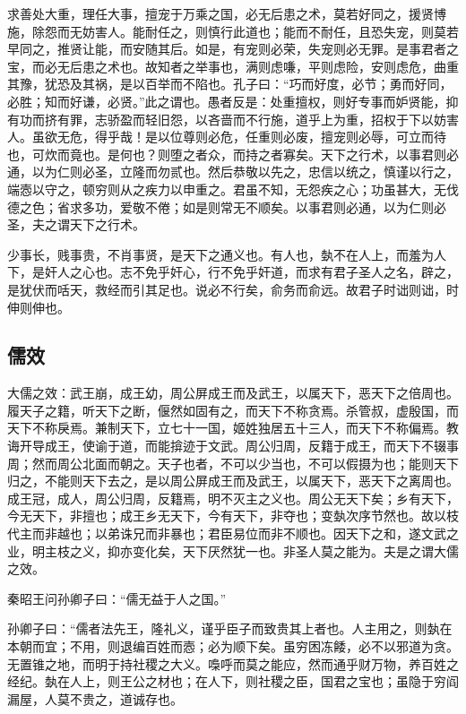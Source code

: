 \documentclass[]{article}
\begin{document}
求善处大重，理任大事，擅宠于万乘之国，必无后患之术，莫若好同之，援贤博施，除怨而无妨害人。能耐任之，则慎行此道也；能而不耐任，且恐失宠，则莫若早同之，推贤让能，而安随其后。如是，有宠则必荣，失宠则必无罪。是事君者之宝，而必无后患之术也。故知者之举事也，满则虑嗛，平则虑险，安则虑危，曲重其豫，犹恐及其祸，是以百举而不陷也。孔子曰：``巧而好度，必节；勇而好同，必胜；知而好谦，必贤。''此之谓也。愚者反是：处重擅权，则好专事而妒贤能，抑有功而挤有罪，志骄盈而轻旧怨，以吝啬而不行施，道乎上为重，招权于下以妨害人。虽欲无危，得乎哉！是以位尊则必危，任重则必废，擅宠则必辱，可立而待也，可炊而竟也。是何也？则堕之者众，而持之者寡矣。天下之行术，以事君则必通，以为仁则必圣，立隆而勿贰也。然后恭敬以先之，忠信以统之，慎谨以行之，端悫以守之，顿穷则从之疾力以申重之。君虽不知，无怨疾之心；功虽甚大，无伐德之色；省求多功，爱敬不倦；如是则常无不顺矣。以事君则必通，以为仁则必圣，夫之谓天下之行术。

少事长，贱事贵，不肖事贤，是天下之通义也。有人也，埶不在人上，而羞为人下，是奸人之心也。志不免乎奸心，行不免乎奸道，而求有君子圣人之名，辟之，是犹伏而咶天，救经而引其足也。说必不行矣，俞务而俞远。故君子时诎则诎，时伸则伸也。

\hypertarget{header-n40}{%
\subsection{儒效}\label{header-n40}}

大儒之效：武王崩，成王幼，周公屏成王而及武王，以属天下，恶天下之倍周也。履天子之籍，听天下之断，偃然如固有之，而天下不称贪焉。杀管叔，虚殷国，而天下不称戾焉。兼制天下，立七十一国，姬姓独居五十三人，而天下不称偏焉。教诲开导成王，使谕于道，而能揜迹于文武。周公归周，反籍于成王，而天下不辍事周；然而周公北面而朝之。天子也者，不可以少当也，不可以假摄为也；能则天下归之，不能则天下去之，是以周公屏成王而及武王，以属天下，恶天下之离周也。成王冠，成人，周公归周，反籍焉，明不灭主之义也。周公无天下矣；乡有天下，今无天下，非擅也；成王乡无天下，今有天下，非夺也；变埶次序节然也。故以枝代主而非越也；以弟诛兄而非暴也；君臣易位而非不顺也。因天下之和，遂文武之业，明主枝之义，抑亦变化矣，天下厌然犹一也。非圣人莫之能为。夫是之谓大儒之效。

秦昭王问孙卿子曰：``儒无益于人之国。''

孙卿子曰：``儒者法先王，隆礼义，谨乎臣子而致贵其上者也。人主用之，则埶在本朝而宜；不用，则退编百姓而悫；必为顺下矣。虽穷困冻餧，必不以邪道为贪。无置锥之地，而明于持社稷之大义。嘄呼而莫之能应，然而通乎财万物，养百姓之经纪。埶在人上，则王公之材也；在人下，则社稷之臣，国君之宝也；虽隐于穷阎漏屋，人莫不贵之，道诚存也。
\end{document}
